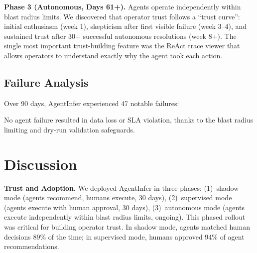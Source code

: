 \documentclass[conference,10pt,letterpaper]{IEEEtran}
\begin{document}
\textbf{Phase 3 (Autonomous, Days 61+).} Agents operate independently within blast radius limits. We discovered that operator trust follows a ``trust curve'': initial enthusiasm (week 1), skepticism after first visible failure (week 3--4), and sustained trust after 30+ successful autonomous resolutions (week 8+). The single most important trust-building feature was the ReAct trace viewer that allows operators to understand exactly why the agent took each action.

\subsection{Failure Analysis}

Over 90 days, AgentInfer experienced 47 notable failures:

\begin{table}[!t]
\caption{Agent Failure Mode Distribution}
\label{tab:failures}
\centering\scriptsize
{}
\end{table}

No agent failure resulted in data loss or SLA violation, thanks to the blast radius limiting and dry-run validation safeguards.


\section{Discussion}
\label{sec:discussion}

\textbf{Trust and Adoption.} We deployed AgentInfer in three phases: (1)~shadow mode (agents recommend, humans execute, 30 days), (2)~supervised mode (agents execute with human approval, 30 days), (3)~autonomous mode (agents execute independently within blast radius limits, ongoing). This phased rollout was critical for building operator trust. In shadow mode, agents matched human decisions 89\% of the time; in supervised mode, humans approved 94\% of agent recommendations.
\end{document}
